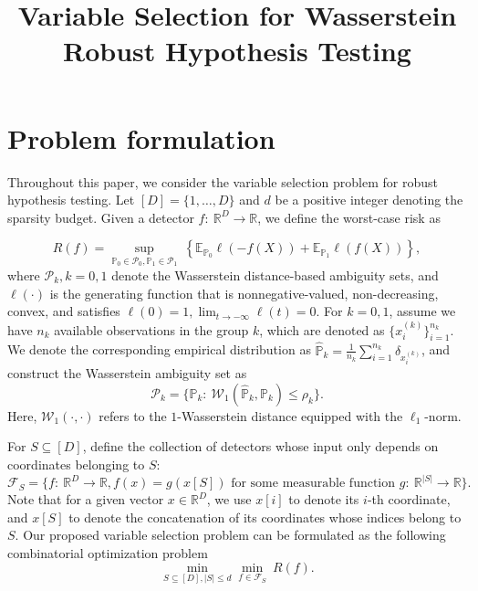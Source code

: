 \documentclass[11pt,a4paper]{article}
\title{Variable Selection for Wasserstein Robust Hypothesis Testing}
\author{}
\date{}
\makeatletter
\theoremstyle{plain}
\renewcommand{\maketitle}{
\begin{center}
{\Large\bfseries\@title\par}
\end{center}\vspace{2pt}}
\makeatother
\begin{document}
\maketitle



\section{Problem formulation}\label{sec:problem}

Throughout this paper, we consider the variable selection problem for robust hypothesis testing. Let $[D]=\{1,\ldots,D\}$ and $d$ be a positive integer denoting the sparsity budget.
Given a detector $f:~\mathbb{R}^D\to\mathbb{R}$, we define the worst-case risk as


\begin{equation}\label{eq:risk}
R(f)=\sup_{\mathbb{P}_0\in\mathcal{P}_0, \mathbb{P}_1\in\mathcal{P}_1}~
\left\{\mathbb E_{\mathbb P_0}\ell(-f(X))+
       \mathbb E_{\mathbb P_1}\ell(f(X))\right\},
\end{equation}
where $\mathcal{P}_k, k=0,1$ denote the Wasserstein distance-based ambiguity sets, and $\ell(\cdot)$ is the generating function that is nonnegative-valued, non-decreasing, convex, and satisfies $\ell(0)=1, \lim_{t\to-\infty}\ell(t)=0$.
For $k=0,1$, assume we have $n_k$ available observations in the group $k$, which are denoted as $\{x_i^{(k)}\}_{i=1}^{n_k}$.
We denote the corresponding empirical distribution as $\widehat{\mathbb{P}}_k=\frac1{n_k}\sum_{i=1}^{n_k}\delta_{x_i^{(k)}}$, and construct the Wasserstein ambiguity set as
\[
\mathcal{P}_k=\Big\{
\mathbb{P}_k:~\mathcal{W}_1(
\widehat{\mathbb{P}}_k, \mathbb{P}_k
)\le \rho_k
\Big\}.
\]
Here, $\mathcal{W}_1(\cdot,\cdot)$ refers to the $1$-Wasserstein distance equipped with the $\ell_1$-norm.


For $S\subseteq[D]$, define the collection of detectors whose input only depends on coordinates belonging to $S$:
\[
\mathcal{F}_S = \Big\{
f:~\mathbb{R}^D\to\mathbb{R}, f(x) = g(x[S])\text{ for some measurable function $g:~\mathbb{R}^{|S|}\to\mathbb{R}$}
\Big\}.
\]
Note that for a given vector $x\in\mathbb{R}^D$, we use $x[i]$ to denote its $i$-th coordinate, and $x[S]$ to denote the concatenation of its coordinates whose indices belong to $S$.
Our proposed variable selection problem can be formulated as the following combinatorial optimization problem
\begin{equation}
\min_{S\subseteq[D], |S|\le d}\min_{f\in\mathcal{F}_S}~R(f).
\end{equation}
\end{document}
